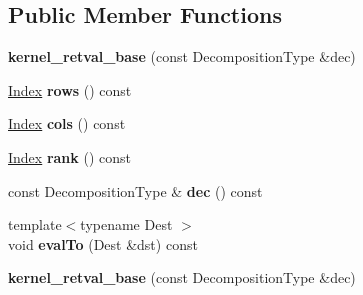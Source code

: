 \subsection*{Public Member Functions}
\begin{DoxyCompactItemize}
\item 
\mbox{\label{struct_eigen_1_1internal_1_1kernel__retval__base_a11788fc65643a5f04d0bf93eb14ab859}} 
{\bfseries kernel\+\_\+retval\+\_\+base} (const Decomposition\+Type \&dec)
\item 
\mbox{\label{struct_eigen_1_1internal_1_1kernel__retval__base_a4c2aa4eeb487d1d3bb12a40511a9e1f2}} 
\hyperlink{namespace_eigen_a62e77e0933482dafde8fe197d9a2cfde}{Index} {\bfseries rows} () const
\item 
\mbox{\label{struct_eigen_1_1internal_1_1kernel__retval__base_ab572364061c0337d460111330aaa5720}} 
\hyperlink{namespace_eigen_a62e77e0933482dafde8fe197d9a2cfde}{Index} {\bfseries cols} () const
\item 
\mbox{\label{struct_eigen_1_1internal_1_1kernel__retval__base_a2c0455b0ab8b9393fb1e0b1e9c030171}} 
\hyperlink{namespace_eigen_a62e77e0933482dafde8fe197d9a2cfde}{Index} {\bfseries rank} () const
\item 
\mbox{\label{struct_eigen_1_1internal_1_1kernel__retval__base_a8aaed82445258ea7bc1d68dac12bad9a}} 
const Decomposition\+Type \& {\bfseries dec} () const
\item 
\mbox{\label{struct_eigen_1_1internal_1_1kernel__retval__base_ad57b289ee5554aed56b35e72f2a7eecc}} 
{\footnotesize template$<$typename Dest $>$ }\\void {\bfseries eval\+To} (Dest \&dst) const
\item 
\mbox{\label{struct_eigen_1_1internal_1_1kernel__retval__base_a11788fc65643a5f04d0bf93eb14ab859}} 
{\bfseries kernel\+\_\+retval\+\_\+base} (const Decomposition\+Type \&dec)
\item 

\end{DoxyCompactItemize}
